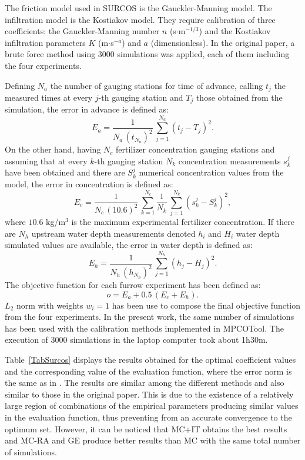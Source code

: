 \documentclass[review,authoryear]{elsarticle}
\newcommand{\EQ}[2]
{\begin{equation}#1\label{#2}\end{equation}}
\newcommand{\PA}[1]{\left(#1\right)}
\begin{document}
The friction model used in SURCOS is the Gauckler-Manning model. The infiltration model is the Kostiakov model. They require calibration of three coefficients: the Gauckler-Manning number $n$ (s$\cdot$m$^{-1/3}$) and the Kostiakov infiltration parameters $K$ (m$\cdot$s$^{-a}$) and $a$ (dimensionless). In the original paper, a brute force method using 3000 simulations was applied, each of them including the four experiments.

Defining $N_a$ the number of gauging stations for time of advance, calling
$t_j$ the measured times at every $j$-th gauging station and $T_j$ those
obtained from the simulation, the error in advance is defined as:
\EQ{E_a=\frac{1}{N_a\,\PA{t_{N_a}}^2}\,\sum_{j=1}^{N_a}\PA{t_j-T_j}^2.}
{EqSurcosErrorAdvance}
On the other hand, having $N_c$ fertilizer concentration gauging stations and
assuming that at every $k$-th gauging station $N_k$ concentration measurements
$s_k^j$ have been obtained and there are $S_k^j$ numerical concentration values
from the model, the error in concentration is defined as:
\EQ
{
	E_c=\frac{1}{N_c\,(10.6)^2}\,\sum_{k=1}^{N_c}\frac{1}{N_k}\,
	\sum_{j=1}^{N_k}\PA{s_k^j-S_k^j}^2,
}{EqSurcosErrorConcentration}
where $10.6$ kg/m$^3$ is the maximum experimental fertilizer concentration. If
there are $N_h$ upstream water depth measurements denoted $h_i$ and $H_i$ water
depth simulated values are available, the error in water depth is defined as:
\EQ{E_h=\frac{1}{N_h\,\PA{h_{N_h}}^2}\,\sum_{j=1}^{N_h}\PA{h_j-H_j}^2.}
{EqErrorDepth}
The objective function for each furrow experiment has been defined as:
\EQ{o=E_a+0.5\,\PA{E_c+E_h}.}{EqSurcosObjective}
$L_2$ norm with weights $w_i=1$ has been use to compose the final objective function from the four experiments. In the present work, the same number of simulations has been used with the calibration methods implemented in MPCOTool. The execution of 3000 simulations in the laptop computer took about 1h30m.

Table~\ref{TabSurcos} displays the results obtained for the optimal coefficient values and the corresponding
value of the evaluation function, where the error norm is the same as in \citet{JaviSurcos2}. The results are similar among the different methods and also similar to those in the original paper. This is due to the existence of a relatively large region of combinations of the empirical parameters producing similar values in the evaluation function, thus preventing from an accurate convergence to the optimum set. However, it can be noticed that MC+IT obtains the best results and MC-RA and GE produce better results than MC with the same total number of simulations.
\end{document}
